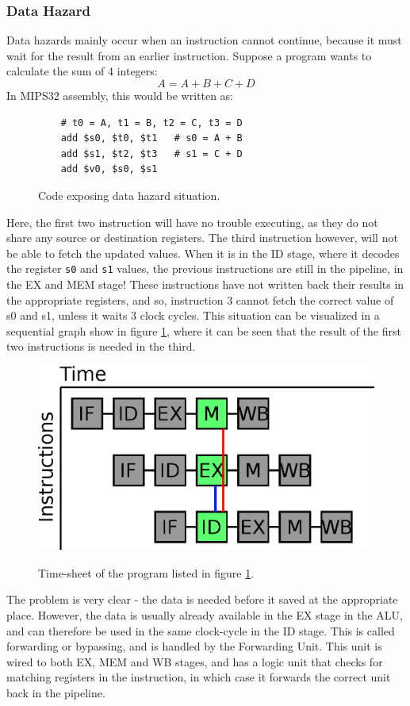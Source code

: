\subsubsection{Data Hazard}
Data hazards mainly occur when an instruction cannot continue, because it must
wait for the result from an earlier instruction. Suppose a program wants to
calculate the sum of 4 integers:
$$A = A + B + C + D$$
In MIPS32 assembly, this would be written as:
\begin{figure}[H]
	\begin{lstlisting}
	# t0 = A, t1 = B, t2 = C, t3 = D
	add $s0, $t0, $t1 	# s0 = A + B
	add $s1, $t2, $t3	# s1 = C + D
	add $v0, $s0, $s1
	\end{lstlisting}
	\caption{Code exposing data hazard situation.}
	\label{fig:data_hazard_code}
\end{figure}
Here, the first two instruction will have no trouble executing, as they do not
share any source or destination registers. The third instruction however, will
not be able to fetch the updated values. When it is in the ID stage, where it decodes the
register \texttt{s0} and \texttt{s1} values, the previous instructions are
still in the pipeline, in the EX and MEM stage! These instructions have not
written back their results in the appropriate registers, and so, instruction 3
cannot fetch the correct value of s0 and s1, unless it waits 3 clock
cycles. This situation can be visualized in a sequential graph show in figure
\ref{fig:data_hazard_code}, where it can be seen that the result of the first
two instructions is needed in the third.\\
\begin{figure}
	\includegraphics[scale=0.4]{pipeline/data_hazard.eps}
	\label{fig:data_hazard}
	\caption{Time-sheet of the program listed in figure
\ref{fig:data_hazard_code}.}
\end{figure}
The problem is very clear - the data is needed before it saved at the
appropriate place. However, the data is usually already available in the EX
stage in the ALU, and can therefore be used in the same clock-cycle in the ID
stage. This is called forwarding or bypassing, and is handled by the
Forwarding Unit. This unit is wired to both EX, MEM and WB stages, and has a
logic unit that checks for matching registers in the instruction, in which case
it forwards the correct unit back in the pipeline.

